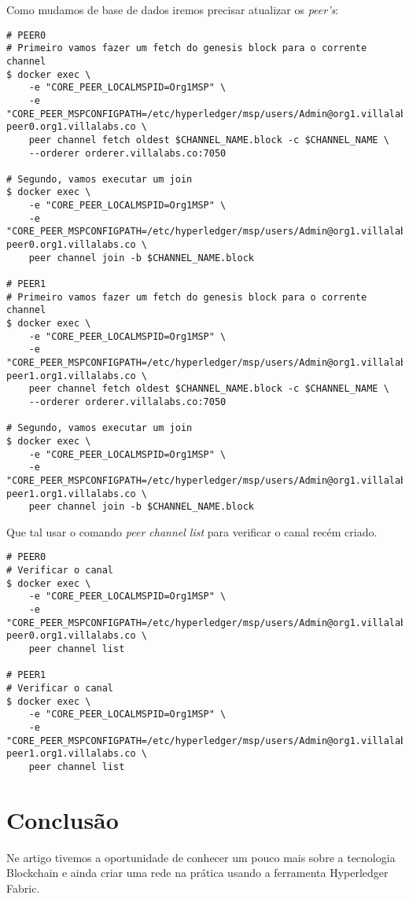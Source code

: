 \documentclass[a4paper,11pt]{article}
\begin{document}
Como mudamos de base de dados iremos precisar atualizar os \textit{peer's}:
\begin{lstlisting}
# PEER0
# Primeiro vamos fazer um fetch do genesis block para o corrente channel
$ docker exec \
    -e "CORE_PEER_LOCALMSPID=Org1MSP" \
    -e "CORE_PEER_MSPCONFIGPATH=/etc/hyperledger/msp/users/Admin@org1.villalabs.co/msp" peer0.org1.villalabs.co \
    peer channel fetch oldest $CHANNEL_NAME.block -c $CHANNEL_NAME \
    --orderer orderer.villalabs.co:7050

# Segundo, vamos executar um join
$ docker exec \
    -e "CORE_PEER_LOCALMSPID=Org1MSP" \
    -e "CORE_PEER_MSPCONFIGPATH=/etc/hyperledger/msp/users/Admin@org1.villalabs.co/msp" peer0.org1.villalabs.co \
    peer channel join -b $CHANNEL_NAME.block

# PEER1
# Primeiro vamos fazer um fetch do genesis block para o corrente channel
$ docker exec \
    -e "CORE_PEER_LOCALMSPID=Org1MSP" \
    -e "CORE_PEER_MSPCONFIGPATH=/etc/hyperledger/msp/users/Admin@org1.villalabs.co/msp" peer1.org1.villalabs.co \
    peer channel fetch oldest $CHANNEL_NAME.block -c $CHANNEL_NAME \
    --orderer orderer.villalabs.co:7050

# Segundo, vamos executar um join
$ docker exec \
    -e "CORE_PEER_LOCALMSPID=Org1MSP" \
    -e "CORE_PEER_MSPCONFIGPATH=/etc/hyperledger/msp/users/Admin@org1.villalabs.co/msp" peer1.org1.villalabs.co \
    peer channel join -b $CHANNEL_NAME.block
\end{lstlisting}

Que tal usar o comando \textit{peer channel list} para verificar o canal recém criado.
\begin{lstlisting}
# PEER0
# Verificar o canal
$ docker exec \
    -e "CORE_PEER_LOCALMSPID=Org1MSP" \
    -e "CORE_PEER_MSPCONFIGPATH=/etc/hyperledger/msp/users/Admin@org1.villalabs.co/msp" peer0.org1.villalabs.co \
    peer channel list

# PEER1
# Verificar o canal
$ docker exec \
    -e "CORE_PEER_LOCALMSPID=Org1MSP" \
    -e "CORE_PEER_MSPCONFIGPATH=/etc/hyperledger/msp/users/Admin@org1.villalabs.co/msp" peer1.org1.villalabs.co \
    peer channel list
\end{lstlisting}

\section{Conclusão}
Ne artigo tivemos a oportunidade de conhecer um pouco mais sobre a tecnologia Blockchain e ainda criar uma rede na prática usando a ferramenta Hyperledger\cite{hyperledger} Fabric\cite{hyperledgerfabric}. 
\end{document}
